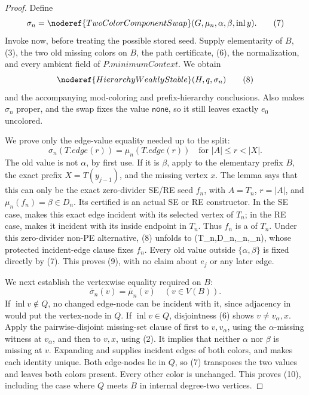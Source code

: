 \begin{proof}
Define
\[
 \sigma_n=\noderef{TwoColorComponentSwap}
       (G,\mu_n,\alpha,\beta,\operatorname{inl}y).            \tag{7}
\]
Invoke  now, before treating the possible
stored seed.  Supply elementarity of \(B\), (3), the two old missing
colors on \(B\), the path certificate, (6), the normalization, and every
ambient field of \(P.\mathit{minimumContext}\).  We obtain
\[
              \noderef{HierarchyWeaklyStable}(H,q,\sigma_n) \tag{8}
\]
and the accompanying mod-coloring and prefix-hierarchy conclusions.
Also  makes \(\sigma_n\) proper, and
the swap fixes the value \(\mathsf{none}\), so it still leaves exactly
\(e_0\) uncolored.

We prove only the edge-value equality needed up to the split:
\[
 \sigma_n(T.\mathit{edge}(r))=\mu_n(T.\mathit{edge}(r))
       \quad\text{for }|A|\le r<|X|.                         \tag{9}
\]
The old value is not \(\alpha\), by first use.  If it is \(\beta\), apply
 to the elementary prefix
\(B\), the exact prefix \(X=T(y_{j-1})\), and the missing vertex \(x\).
The lemma says that this can only be the exact zero-divider SE/RE seed
\(f_n\), with \(A=T_n\), \(r=|A|\), and
\(\mu_n(f_n)=\beta\in D_n\).  Its certified
 is an actual SE or RE constructor.  In the
SE case,  makes this exact edge incident
with its selected vertex of \(T_n\); in the RE case,
 makes it incident with its
inside endpoint in \(T_n\).  Thus \(f_n\) is a
 of \(T_n\).  Under this zero-divider non-PE
alternative, (8) unfolds to
(T_n,D_n,\mu_n,\sigma_n)\), whose protected
incident-edge clause fixes \(f_n\).  Every old value outside
\(\{\alpha,\beta\}\) is fixed directly by (7).  This proves (9), with no
claim about \(e_j\) or any later edge.

We next establish the vertexwise equality required on \(B\):
\[
 \overline\sigma_n(v)=\overline\mu_n(v)\quad(v\in V(B)).      \tag{10}
\]
If \(\operatorname{inl}v\notin Q\), no changed edge-node can be incident
with it, since adjacency in  would put the
vertex-node in \(Q\).  If \(\operatorname{inl}v\in Q\), disjointness (6)
shows \(v\ne v_\alpha,x\).  Apply the pairwise-disjoint missing-set clause
of  first to \(v,v_\alpha\), using
the \(\alpha\)-missing witness at \(v_\alpha\), and then to \(v,x\),
using (2).  It implies that neither \(\alpha\) nor \(\beta\) is missing
at \(v\).  Expanding
 and  supplies incident
edges of both colors, and  makes each
identity unique.  Both edge-nodes lie in \(Q\), so (7) transposes the two
values and leaves both colors present.  Every other color is unchanged.
This proves (10), including the case where \(Q\) meets \(B\) in internal
degree-two vertices.


\end{proof}
